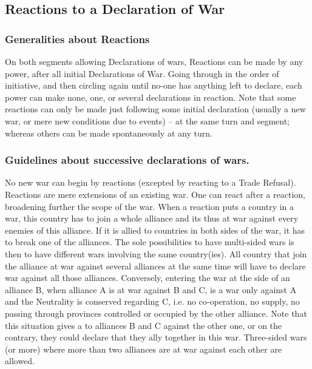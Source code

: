 \subsection{Reactions to a Declaration of War} \label{chDiplo:diplo:Reactions}


\subsubsection{Generalities about Reactions}
\aparag On both segments allowing Declarations of wars, Reactions can be made
by any power, after all initial Declarations of War.  Going through in the
order of initiative, and then circling again until no-one has anything left to
declare, each power can make none, one, or several declarations in reaction.
\bparag Note that some reactions can only be made just following some initial
declaration (usually a new war, or mere new conditions due to events) -- at
the same turn and segment; whereas others can be made spontaneously at any
turn.  \diploreac


\subsubsection{Guidelines about successive declarations of wars.}
\aparag No new war can begin by reactions (excepted by reacting to a Trade
Refusal). Reactions are mere extensions of an existing war.  One can react
after a reaction, broadening further the scope of the war.
\aparag When a reaction puts a country in a war, this country has to join a
whole alliance and its thus at war against every enemies of this alliance. If
it is allied to countries in both sides of the war, it has to break one of the
alliances.
\aparag The sole possibilities to have multi-sided wars is then to have
different wars involving the same country(ies). All country that join the
alliance at war against several alliances at the same time will have to
declare war against all those alliances.
\bparag Conversely, entering the war at the side of an alliance B, when
alliance A is at war against B and C, is a war only against A and the
Neutrality is conserved regarding C, i.e. no co-operation, no supply, no
passing through provinces controlled or occupied by the other alliance.  Note
that this situation gives a \CB to alliances B and C against the other one, or
on the contrary, they could declare that they ally together in this war.
\bparag Three-sided wars (or more) where more than two alliances are at war
against each other are allowed.


